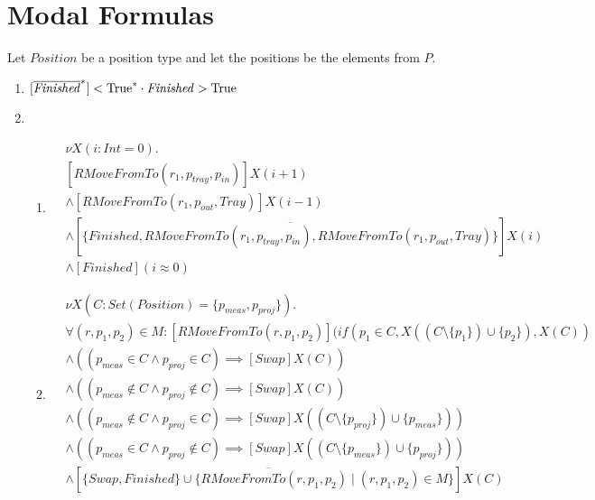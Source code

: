 \section{Modal Formulas}\label{sec:modal_formulas}
Let $\mathit{Position}$ be a position type and let the positions be the elements from $P$.
\begin{enumerate}
    \item $[\overline{\mathit{Finished}}^{*}]<\text{True}^{*} \cdot \mathit{Finished}>\text{True}$
    \item \begin{enumerate}
        \item \begin{align*}
            &\nu X(i:\mathit{Int} = 0) . & \\
            &[\mathit{RMoveFromTo}(r_1, p_\mathit{tray}, p_\mathit{in})]X(i+1) \\
            &\wedge [\mathit{RMoveFromTo}(r_1, p_\mathit{out}, \mathit{Tray})]X(i-1) \\
            &\wedge [\overline{\{\mathit{Finished}, \mathit{RMoveFromTo}(r_1, p_\mathit{tray}, p_\mathit{in}), \mathit{RMoveFromTo}(r_1, p_\mathit{out}, \mathit{Tray})\}}]X(i) \\
            &\wedge [\mathit{Finished}](i \approx 0)
        \end{align*}
        \item \begin{align*}
            &\nu X(C : \mathit{Set}(\mathit{Position}) = \{p_\mathit{meas},p_\mathit{proj}\}).\\
            & \forall (r, p_1, p_2) \in M: [RMoveFromTo(r, p_1, p_2)](if(p_1 \in C, X((C \setminus \{p_1\}) \cup\{p_2\}), X(C))\\
            &\wedge ((p_\mathit{meas} \in C \wedge p_\mathit{proj} \in C) \implies [Swap]X(C))\\
            &\wedge ((p_\mathit{meas} \notin C \wedge p_\mathit{proj} \notin C) \implies [Swap]X(C))\\
            &\wedge ((p_\mathit{meas} \notin C \wedge p_\mathit{proj} \in C) \implies [Swap]X((C \setminus \{p_\mathit{proj}\}) \cup \{p_\mathit{meas}\}))\\
            &\wedge ((p_\mathit{meas} \in C \wedge p_\mathit{proj} \notin C) \implies [Swap]X((C \setminus \{p_\mathit{meas}\}) \cup \{p_\mathit{proj}\}))\\
            &\wedge [\overline{\{\mathit{Swap}, \mathit{Finished}\} \cup \{\mathit{RMoveFromTo}(r, p_1, p_2) \mid (r, p_1, p_2) \in M\}}]X(C)\\

\end{align*}
\end{enumerate}
\end{enumerate}
